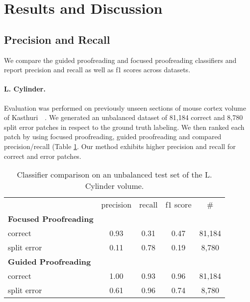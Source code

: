 



\section{Results and Discussion}


\subsection{Precision and Recall}

We compare the guided proofreading and focused proofreading classifiers and report precision and recall as well as f1 scores across datasets.

\paragraph{L. Cylinder.} Evaluation was performed on previously unseen sections of mouse cortex volume of Kasthuri~\etal~\cite{kasthuri2015saturated}. We generated an unbalanced dataset of 81,184 correct and 8,780 split error patches in respect to the ground truth labeling. We then ranked each patch by using focused proofreading, guided proofreading and compared precision/recall (Table \ref{tab:prcyl}. Our method exhibits higher precision and recall for correct and error patches.

\begin{table}[h]
\caption{Classifier comparison on an unbalanced test set of the L. Cylinder volume.}%

\small{
\begin{tabular}{l|c|c|c|c}

 & precision & recall & f1 score & \# \\ 
\textbf{Focused Proofreading} & ~ & ~ & ~ & ~ \\ 
correct & 0.93 & 0.31 & 0.47 & 81,184 \\ 
split error & 0.11 & 0.78 & 0.19 & 8,780 \\ 
\textbf{Guided Proofreading} & ~ & ~ & ~ & ~ \\ 
correct & 1.00 & 0.93 & 0.96 & 81,184 \\ 
split error & 0.61 & 0.96 & 0.74 & 8,780 \\ 
\end{tabular} 
}
\label{tab:prcyl}
\end{table}

